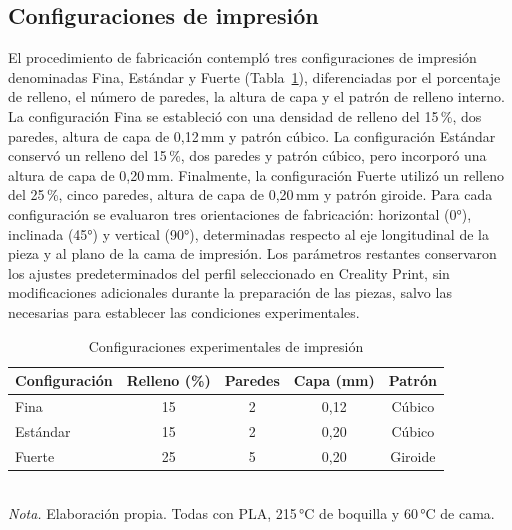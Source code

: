 \documentclass[10pt,twocolumn]{article}
\begin{document}
\subsection{Configuraciones de impresión}
El procedimiento de fabricación contempló tres configuraciones de impresión denominadas Fina, Estándar y Fuerte (Tabla~\ref{tab:config}), diferenciadas por el porcentaje de relleno, el número de paredes, la altura de capa y el patrón de relleno interno. La configuración Fina se estableció con una densidad de relleno del 15\,\%, dos paredes, altura de capa de 0,12\,mm y patrón cúbico. La configuración Estándar conservó un relleno del 15\,\%, dos paredes y patrón cúbico, pero incorporó una altura de capa de 0,20\,mm. Finalmente, la configuración Fuerte utilizó un relleno del 25\,\%, cinco paredes, altura de capa de 0,20\,mm y patrón giroide. Para cada configuración se evaluaron tres orientaciones de fabricación: horizontal (0°), inclinada (45°) y vertical (90°), determinadas respecto al eje longitudinal de la pieza y al plano de la cama de impresión. Los parámetros restantes conservaron los ajustes predeterminados del perfil seleccionado en Creality Print, sin modificaciones adicionales durante la preparación de las piezas, salvo las necesarias para establecer las condiciones experimentales.
\begin{table}[t]
\caption{Configuraciones experimentales de impresión}\label{tab:config}
\centering\small
\begin{tabular}{@{}lcccc@{}}\toprule
Configuración & Relleno (\%) & Paredes & Capa (mm) & Patrón\\\midrule
Fina & 15 & 2 & 0,12 & Cúbico\\
Estándar & 15 & 2 & 0,20 & Cúbico\\
Fuerte & 25 & 5 & 0,20 & Giroide\\\bottomrule
\end{tabular}\\[2pt]
\footnotesize\textit{Nota.} Elaboración propia. Todas con PLA, 215\,°C de boquilla y 60\,°C de cama.
\end{table}
\end{document}
